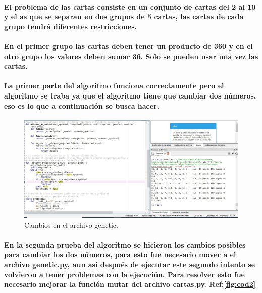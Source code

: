 \documentclass[10pt,a4paper]{article}
\begin{document}
\paragraph{El problema de las cartas consiste en un conjunto de cartas del 2 al 10 y el as que se separan en dos grupos de 5 cartas, las cartas de cada grupo tendrá diferentes restricciones.}

\paragraph{En el primer grupo las cartas deben tener un producto de 360 y en el otro grupo los valores deben sumar 36. Solo se pueden usar una vez las cartas.}

\paragraph{
La primer parte del algoritmo funciona correctamente pero el algoritmo se traba ya que el algoritmo tiene que cambiar dos n\'umeros, eso es lo que a continuaci\'on se busca hacer.
}

\begin{figure}[H]
\includegraphics[scale=0.4] {CambiosGenetic.jpg}
\caption{Cambios en el archivo genetic.}
\label{fig:cod1}
\end{figure}



\paragraph{
En la segunda prueba del algoritmo se hicieron los cambios posibles para cambiar los dos n\'umeros, para esto fue necesario mover a el archivo genetic.py, aun as\'i despu\'es de ejecutar este segundo intento se volvieron a tener problemas con la ejecuci\'on. Para resolver esto fue necesario mejorar la funci\'on mutar del archivo cartas.py. Ref:\ref{fig:cod2}
}
\end{document}
